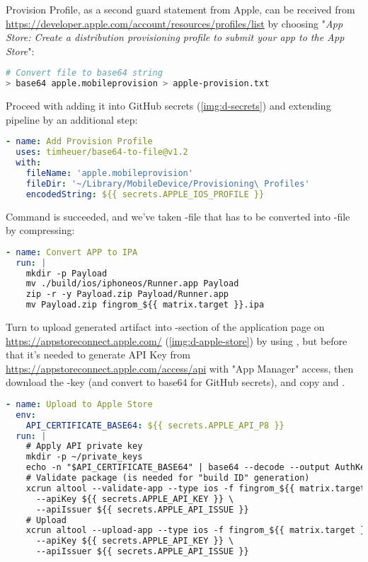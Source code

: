 Provision Profile, as a second guard statement from Apple, can be received from
\href{https://developer.apple.com/account/resources/profiles/list}{https://developer.apple.com/account/resources/profiles/list}
by choosing "\emph{App Store: Create a distribution provisioning profile to submit your app to the App Store}":

\begin{lstlisting}[language=bash]
# Convert file to base64 string
> base64 apple.mobileprovision > apple-provision.txt
\end{lstlisting}

\noindent Proceed with adding it into GitHub secrets (\cref{img:d-secrets}) and extending pipeline by an additional step:

\begin{lstlisting}[language=yaml]
- name: Add Provision Profile
  uses: timheuer/base64-to-file@v1.2
  with:
    fileName: 'apple.mobileprovision'
    fileDir: '~/Library/MobileDevice/Provisioning\ Profiles'
    encodedString: ${{ secrets.APPLE_IOS_PROFILE }}
\end{lstlisting}

\noindent Command  is succeeded, and we've taken -file that has to be 
converted into -file by compressing:

\begin{lstlisting}[language=yaml]
- name: Convert APP to IPA
  run: |
    mkdir -p Payload
    mv ./build/ios/iphoneos/Runner.app Payload
    zip -r -y Payload.zip Payload/Runner.app
    mv Payload.zip fingrom_${{ matrix.target }}.ipa
\end{lstlisting}


\noindent Turn to upload generated artifact into -section of the application page on 
\href{https://appstoreconnect.apple.com/}{https://appstoreconnect.apple.com/} (\cref{img:d-apple-store}) by using 
, but before that it's needed to generate API Key from 
\href{https://appstoreconnect.apple.com/access/api}{https://appstoreconnect.apple.com/access/api} with "App Manager"
access, then download the -key (and convert to base64 for GitHub secrets), and copy  and .

\begin{lstlisting}[language=yaml]
- name: Upload to Apple Store
  env:
    API_CERTIFICATE_BASE64: ${{ secrets.APPLE_API_P8 }}
  run: |
    # Apply API private key
    mkdir -p ~/private_keys
    echo -n "$API_CERTIFICATE_BASE64" | base64 --decode --output AuthKey_${{ secrets.APPLE_API_KEY }}.p8
    # Validate package (is needed for "build ID" generation)
    xcrun altool --validate-app --type ios -f fingrom_${{ matrix.target }}.ipa \ 
      --apiKey ${{ secrets.APPLE_API_KEY }} \
      --apiIssuer ${{ secrets.APPLE_API_ISSUE }}
    # Upload
    xcrun altool --upload-app --type ios -f fingrom_${{ matrix.target }}.ipa \
      --apiKey ${{ secrets.APPLE_API_KEY }} \
      --apiIssuer ${{ secrets.APPLE_API_ISSUE }}
\end{lstlisting}

